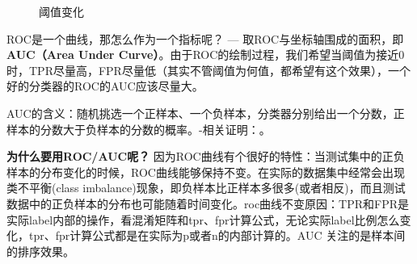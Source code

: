 \begin{figure}[h]
	\centering
	\quad
	\caption{阈值变化}
	\label{fig:threshold-change}
\end{figure}
ROC是一个曲线，那怎么作为一个指标呢？ --- 取ROC与坐标轴围成的面积，即\textbf{AUC（Area Under Curve）}。由于ROC的绘制过程，我们希望当阈值为接近0时，TPR尽量高，FPR尽量低（其实不管阈值为何值，都希望有这个效果），一个好的分类器的ROC的AUC应该尽量大。

AUC的含义：随机挑选一个正样本、一个负样本，分类器分别给出一个分数，正样本的分数大于负样本的分数的概率。-相关证明：\href{http://vividfree.github.io/%E6%9C%BA%E5%99%A8%E5%AD%A6%E4%B9%A0/2015/11/20/understanding-ROC-and-AUC}{\tbc{red}{理解 ROC 和 AUC}}。

\textbf{为什么要用ROC/AUC呢？}\newline
因为ROC曲线有个很好的特性：当测试集中的正负样本的分布变化的时候，ROC曲线能够保持不变。在实际的数据集中经常会出现类不平衡(class imbalance)现象，即负样本比正样本多很多(或者相反)，而且测试数据中的正负样本的分布也可能随着时间变化。roc曲线不变原因：TPR和FPR是实际label内部的操作，看混淆矩阵和tpr、fpr计算公式，无论实际label比例怎么变化，tpr、fpr计算公式都是在实际为p或者n的内部计算的。AUC 关注的是样本间的排序效果。

